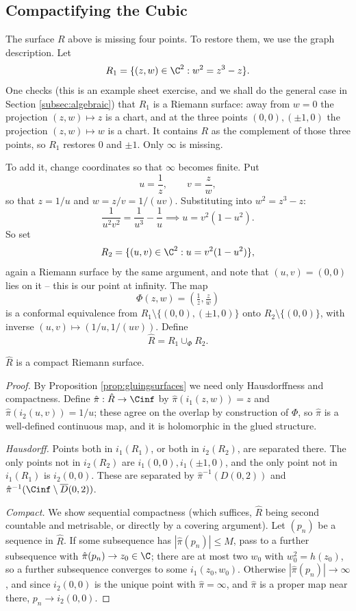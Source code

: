 \subsection{Compactifying the Cubic}\label{subsec:compactifycubic}

The surface $R$ above is missing four points. To restore them, we use the graph
description. Let
$$
R_1 = \{(z,w) \in \C^2 : w^2 = z^3 - z\}.
$$
One checks (this is an example sheet exercise, and we shall do the general case in Section
\ref{subsec:algebraic}) that $R_1$ is a Riemann surface: away from $w=0$ the projection
$(z,w)\mapsto z$ is a chart, and at the three points $(0,0),(\pm 1, 0)$ the projection
$(z,w)\mapsto w$ is a chart. It contains $R$ as the complement of those three points, so
$R_1$ restores $0$ and $\pm 1$. Only $\infty$ is missing.

To add it, change coordinates so that $\infty$ becomes finite. Put
$$
u = \frac{1}{z}, \qquad v = \frac{z}{w},
$$
so that $z = 1/u$ and $w = z/v = 1/(uv)$. Substituting into $w^2 = z^3 - z$:
$$
\frac{1}{u^2v^2} = \frac{1}{u^3} - \frac1u \implies u = v^2(1 - u^2).
$$
So set
$$
R_2 = \{(u,v)\in\C^2 : u = v^2(1-u^2)\},
$$
again a Riemann surface by the same argument, and note that $(u,v) = (0,0)$ lies on it --
this is our point at infinity. The map
$$
\Phi(z,w) = \left(\tfrac1z, \tfrac zw\right)
$$
is a conformal equivalence from $R_1 \setminus \{(0,0),(\pm1,0)\}$ onto
$R_2 \setminus \{(0,0)\}$, with inverse $(u,v)\mapsto (1/u, 1/(uv))$. Define
$$
\hat R = R_1 \cup_\Phi R_2.
$$

\begin{proposition}
	$\hat R$ is a compact Riemann surface.
\end{proposition}

\begin{proof}
	By Proposition \ref{prop:gluingsurfaces} we need only Hausdorffness and compactness.
	Define $\hat\pi : \hat R \to \Cinf$ by $\hat\pi(i_1(z,w)) = z$ and
	$\hat\pi(i_2(u,v)) = 1/u$; these agree on the overlap by construction of $\Phi$, so
	$\hat\pi$ is a well-defined continuous map, and it is holomorphic in the glued
	structure.

	\emph{Hausdorff.} Points both in $i_1(R_1)$, or both in $i_2(R_2)$, are separated
	there. The only points not in $i_2(R_2)$ are $i_1(0,0), i_1(\pm1,0)$, and the only
	point not in $i_1(R_1)$ is $i_2(0,0)$. These are separated by
	$\hat\pi^{-1}(D(0,2))$ and $\hat\pi^{-1}(\Cinf\setminus \overline D(0,2))$.

	\emph{Compact.} We show sequential compactness (which suffices, $\hat R$ being
	second countable and metrisable, or directly by a covering argument). Let $(p_n)$ be a
	sequence in $\hat R$. If some subsequence has $|\hat\pi(p_n)| \leq M$, pass to a further
	subsequence with $\hat\pi(p_n) \to z_0 \in \C$; there are at most two $w_0$ with
	$w_0^2 = h(z_0)$, so a further subsequence converges to some $i_1(z_0,w_0)$. Otherwise
	$|\hat\pi(p_n)|\to\infty$, and since $i_2(0,0)$ is the unique point with
	$\hat\pi = \infty$, and $\hat\pi$ is a proper map near there, $p_n \to i_2(0,0)$.
\end{proof}

